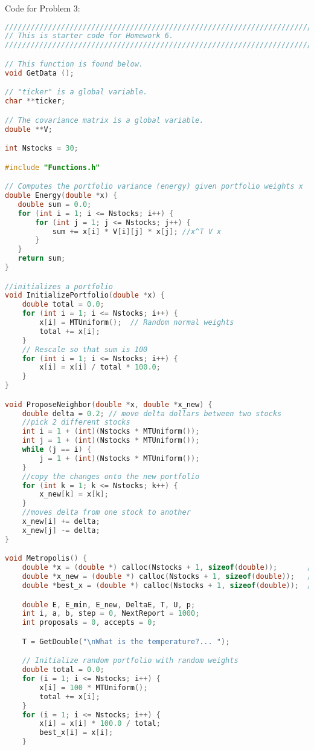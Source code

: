 \documentclass{report}
\begin{document}
Code for Problem 3:
\begin{lstlisting}[language=c++]
////////////////////////////////////////////////////////////////////////////////
// This is starter code for Homework 6.
////////////////////////////////////////////////////////////////////////////////

// This function is found below.
void GetData ();

// "ticker" is a global variable.
char **ticker;

// The covariance matrix is a global variable.
double **V;

int Nstocks = 30;

#include "Functions.h"

// Computes the portfolio variance (energy) given portfolio weights x
double Energy(double *x) {
   double sum = 0.0;
   for (int i = 1; i <= Nstocks; i++) {
       for (int j = 1; j <= Nstocks; j++) {
           sum += x[i] * V[i][j] * x[j]; //x^T V x
       }
   }
   return sum;
}

//initializes a portfolio
void InitializePortfolio(double *x) {
    double total = 0.0;
    for (int i = 1; i <= Nstocks; i++) {
        x[i] = MTUniform();  // Random normal weights
        total += x[i];
    }
    // Rescale so that sum is 100
    for (int i = 1; i <= Nstocks; i++) {
        x[i] = x[i] / total * 100.0;
    }
}

void ProposeNeighbor(double *x, double *x_new) {
    double delta = 0.2; // move delta dollars between two stocks
    //pick 2 different stocks
    int i = 1 + (int)(Nstocks * MTUniform());
    int j = 1 + (int)(Nstocks * MTUniform());
    while (j == i) {
        j = 1 + (int)(Nstocks * MTUniform());
    }
    //copy the changes onto the new portfolio
    for (int k = 1; k <= Nstocks; k++) {
        x_new[k] = x[k];
    }
    //moves delta from one stock to another
    x_new[i] += delta;
    x_new[j] -= delta;
}

void Metropolis() {
    double *x = (double *) calloc(Nstocks + 1, sizeof(double));       // current portfolio
    double *x_new = (double *) calloc(Nstocks + 1, sizeof(double));   // proposed neighbor
    double *best_x = (double *) calloc(Nstocks + 1, sizeof(double));  // best found

    double E, E_min, E_new, DeltaE, T, U, p;
    int i, a, b, step = 0, NextReport = 1000;
    int proposals = 0, accepts = 0;

    T = GetDouble("\nWhat is the temperature?... ");

    // Initialize random portfolio with random weights
    double total = 0.0;
    for (i = 1; i <= Nstocks; i++) {
        x[i] = 100 * MTUniform();
        total += x[i];
    }
    for (i = 1; i <= Nstocks; i++) {
        x[i] = x[i] * 100.0 / total;
        best_x[i] = x[i];
    }


\end{lstlisting}
\end{document}
